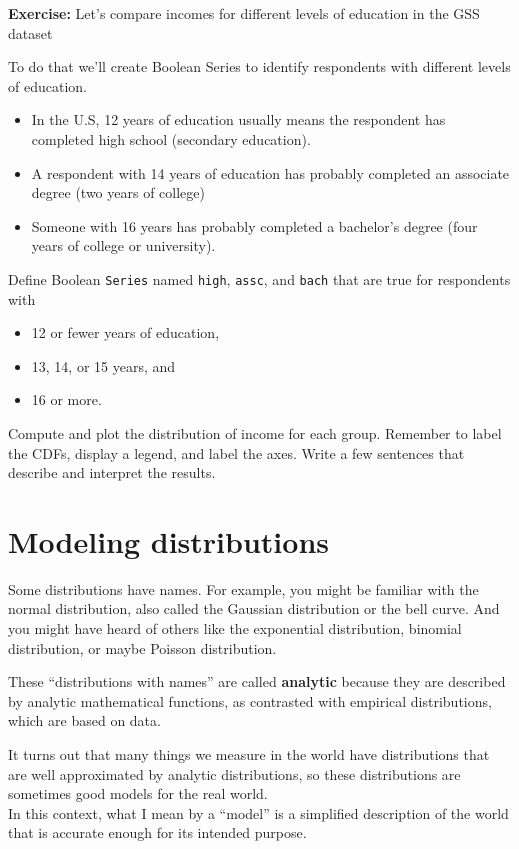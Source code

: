 \textbf{Exercise:} Let's compare incomes for different levels of
education in the GSS dataset

To do that we'll create Boolean Series to identify respondents with
different levels of education.

\begin{itemize}
\item
  In the U.S, 12 years of education usually means the respondent has
  completed high school (secondary education).
\item
  A respondent with 14 years of education has probably completed an
  associate degree (two years of college)
\item
  Someone with 16 years has probably completed a bachelor's degree (four
  years of college or university).
\end{itemize}

Define Boolean \passthrough{\lstinline!Series!} named
\passthrough{\lstinline!high!}, \passthrough{\lstinline!assc!}, and
\passthrough{\lstinline!bach!} that are true for respondents with

\begin{itemize}
\item
  12 or fewer years of education,
\item
  13, 14, or 15 years, and
\item
  16 or more.
\end{itemize}

Compute and plot the distribution of income for each group. Remember to
label the CDFs, display a legend, and label the axes. Write a few
sentences that describe and interpret the results.

\hypertarget{modeling-distributions}{%
\section{Modeling distributions}\label{modeling-distributions}}

Some distributions have names. For example, you might be familiar with
the normal distribution, also called the Gaussian distribution or the
bell curve. And you might have heard of others like the exponential
distribution, binomial distribution, or maybe Poisson distribution.

These ``distributions with names'' are called \textbf{analytic} because
they are described by analytic mathematical functions, as contrasted
with empirical distributions, which are based on data.

It turns out that many things we measure in the world have distributions
that are well approximated by analytic distributions, so these
distributions are sometimes good models for the real world.\\
In this context, what I mean by a ``model'' is a simplified description
of the world that is accurate enough for its intended purpose.

